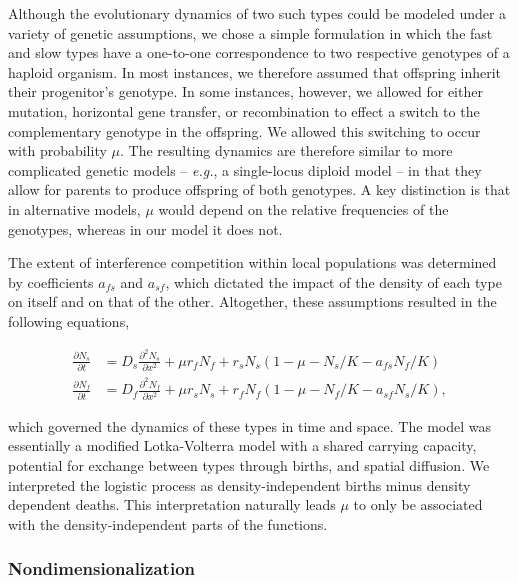 \documentclass[11pt]{article}
\newcommand{\eg}{{\em e.g.}, }
\begin{document}
Although the evolutionary dynamics of two such types could be modeled under a variety of genetic assumptions, we chose a simple formulation in which the fast and slow types have a one-to-one correspondence to two respective genotypes of a haploid organism. In most instances, we therefore assumed that offspring inherit their progenitor's genotype. In some instances, however, we allowed for either mutation, horizontal gene transfer, or recombination to effect a switch to the complementary genotype in the offspring. We allowed this switching to occur with probability $\mu$. The resulting dynamics are therefore similar to more complicated genetic models -- \eg a single-locus diploid model -- in that they allow for parents to produce offspring of both genotypes. A key distinction is that in alternative models, $\mu$ would depend on the relative frequencies of the genotypes, whereas in our model it does not.

The extent of interference competition within local populations was determined by coefficients $a_{fs}$ and $a_{sf}$, which dictated the impact of the density of each type on itself and on that of the other. Altogether, these assumptions resulted in the following equations,

\vspace*{-22pt}
\begin{subequations}
\begin{align}
\frac{\partial N_s}{\partial t} &= D_s \frac{\partial ^ 2 N_s}{\partial x ^ 2} + \mu r_f N_f + r_s N_s \left(1 - \mu - N_s / K - a_{fs} N_f / K \right) \label{dNsdt} \\
\frac{\partial N_f}{\partial t} &= D_f \frac{\partial ^ 2 N_f}{\partial x ^ 2} + \mu r_s N_s + r_f N_f \left(1 - \mu - N_f / K - a_{sf} N_s / K \right) \label{dNfdt},
\end{align}
\end{subequations}

\noindent which governed the dynamics of these types in time and space. The model was essentially a modified Lotka-Volterra model with a shared carrying capacity, potential for exchange between types through births, and spatial diffusion. We interpreted the logistic process as density-independent births minus density dependent deaths. This interpretation naturally leads $\mu$ to only be associated with the density-independent parts of the functions.

\subsubsection*{Nondimensionalization}
\end{document}
